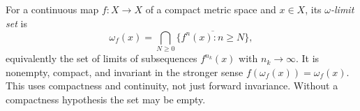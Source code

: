 
For a continuous map $f:X\to X$ of a compact metric space and $x\in X$, its \emph{$\omega$-limit set} is
\[
\omega_f(x)=\bigcap_{N\ge0}\overline{\{f^n(x):n\ge N\}},
\]
equivalently the set of limits of subsequences $f^{n_k}(x)$ with $n_k\to\infty$. It is nonempty, compact, and invariant in the stronger sense $f(\omega_f(x))=\omega_f(x)$. This uses compactness and continuity, not just forward invariance. Without a compactness hypothesis the set may be empty.
